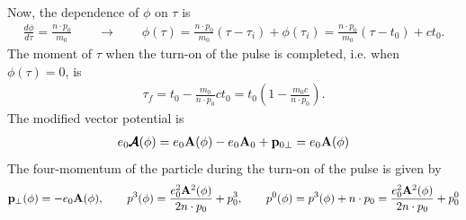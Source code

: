 Now, the dependence of $\phi$ on $\tau$ is
\begin{align}
    \frac{d\phi}{d\tau} = \frac{n\cdot p_0}{m_0} \qquad \longrightarrow \qquad \phi(\tau) = \frac{n\cdot p_0}{m_0}(\tau-\tau_i)+\phi(\tau_i) = \frac{n\cdot p_0}{m_0}(\tau - t_0) + ct_0.
\end{align}
The moment of $\tau$ when the turn-on of the pulse is completed, i.e. when $\phi(\tau) = 0$, is
\begin{align}
    \tau_f = t_0 - \frac{m_0}{n\cdot p_0} ct_0 = t_0\left(1 - \frac{m_0 c}{n\cdot p_0}\right).
\end{align}
The modified vector potential is
\begin{align}
    e_0{\pmb{\cal A}}(\phi) = e_0{\bf A}(\phi) -e_0{\bf A}_0+ {\bf p}_{0\perp} = e_0{\bf A}(\phi)
\end{align}
The four-momentum of the particle during the turn-on of the pulse is given by
\begin{align}
    {\bf p}_\perp(\phi) = -e_0 {\bf A}(\phi), \qquad p^3(\phi) = \frac{e_0^2 {\bf A}^2(\phi)}{2n\cdot p_0}  + p_0^3, \qquad p^0(\phi) = p^3(\phi) + n\cdot p_0 = \frac{e_0^2 {\bf A}^2(\phi)}{2n\cdot p_0}  + p_0^0
\end{align}
